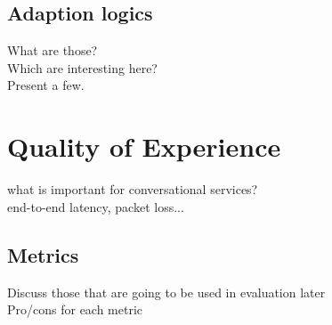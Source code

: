 \subsection{Adaption logics}
What are those? \\
Which are interesting here? \\
Present a few.

\section{Quality of Experience}
what is important for conversational services? \\
end-to-end latency, packet loss...

\subsection{Metrics}
Discuss those that are going to be used in evaluation later \\
Pro/cons for each metric

